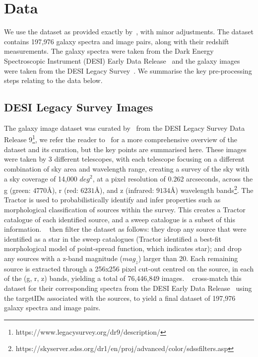 
\section{Data}\label{sec:data}
We use the dataset as provided exactly by~\cite{astroclip}, with minor adjustments.
The dataset contains 197,976 galaxy spectra and image pairs, along with their redshift measurements.
The galaxy spectra were taken from the Dark Energy Spectroscopic Instrument (DESI) Early Data Release~\citep{desiearly2023}
and the galaxy images were taken from the DESI Legacy Survey~\citep{desilegacy2018}.
We summarise the key pre-processing steps relating to the data below.

\subsection{DESI Legacy Survey Images}\label{subsec:images}
The galaxy image dataset was curated by~\cite{stein2022} from the DESI Legacy Survey Data Release 9\footnote{https://www.legacysurvey.org/dr9/description/},
we refer the reader to~\cite{stein2022, astroclip} for a more comprehensive overview of the dataset and its curation, but the
key points are summarised here.
These images were taken by 3 different telescopes, with each telescope focusing on a different combination of sky area
and wavelength range, creating a survey of the sky with a sky coverage of 14,000 $deg^{2}$, at a pixel resolution of 0.262 arcseconds,
across the g (green: $4770 \si{\angstrom}$), r (red: $6231 \si{\angstrom}$), and z (infrared: $9134 \si{\angstrom}$) wavelength
bands\footnote{https://skyserver.sdss.org/dr1/en/proj/advanced/color/sdssfilters.asp}.
The Tractor is used to probabilistically identify and infer properties such
as morphological classification of sources within the survey.
This creates a Tractor catalogue of each identified source, and a sweep catalogue is a subset of this information.
~\cite{stein2022} then filter the dataset as follows: they drop any source that were identified as a star in the sweep catalogues
(Tractor identified a best-fit morphological model of point-spread function, which indicates star); and drop any sources
with a z-band magnitude ($mag_{z}$) larger than 20.
Each remaining source is extracted through a 256x256 pixel cut-out centred on the source, in each of the (g, r, z) bands,
yielding a total of 76,446,849 images.
~\cite{astroclip} cross-match this dataset for their corresponding spectra from the DESI Early Data Release~\citep{desiearly2023}
using the targetIDs associated with the sources, to yield a final dataset of 197,976 galaxy spectra and image pairs.


